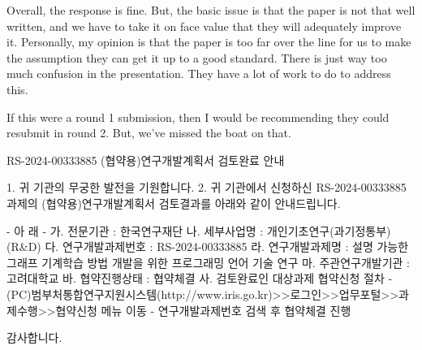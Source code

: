 


Overall, the response is fine. But, the basic issue is that the paper is not that well written, and we have to take it on face value that they will adequately improve it. Personally, my opinion is that the paper is too far over the line for us to make the assumption they can get it up to a good standard. There is just way too much confusion in the presentation. They have a lot of work to do to address this.

If this were a round 1 submission, then I would be recommending they could resubmit in round 2. But, we've missed the boat on that.





RS-2024-00333885 (협약용)연구개발계획서 검토완료 안내

1. 귀 기관의 무궁한 발전을 기원합니다.
2. 귀 기관에서 신청하신 RS-2024-00333885 과제의 (협약용)연구개발계획서 검토결과를 아래와 같이 안내드립니다.

    - 아 래 -  
가. 전문기관               : 한국연구재단
나. 세부사업명            : 개인기초연구(과기정통부)(R&D)
다. 연구개발과제번호   : RS-2024-00333885  
라. 연구개발과제명      : 설명 가능한 그래프 기계학습 방법 개발을 위한 프로그래밍 언어 기술 연구  
마. 주관연구개발기관   : 고려대학교
바. 협약진행상태         : 협약체결
사. 검토완료인 대상과제 협약신청 절차
- (PC)범부처통합연구지원시스템(http://www.iris.go.kr)>>로그인>>업무포털>>과제수행>>협약신청 메뉴 이동
- 연구개발과제번호 검색 후 협약체결 진행

감사합니다.



